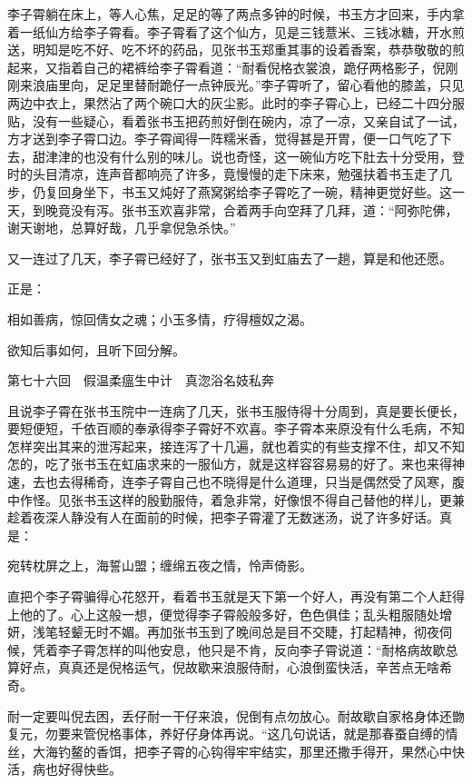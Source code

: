 \documentclass[12pt,UTF8]{ctexbook}
\begin{document}
{{{李子霄躺在床上，等人心焦，足足的等了两点多钟的时候，书玉方才回来，手内拿着一纸仙方给李子霄看。李子霄看了这个仙方，见是三钱薏米、三钱冰糖，开水煎送，明知是吃不好、吃不坏的药品，见张书玉郑重其事的设着香案，恭恭敬敬的煎起来，又指着自己的裙裤给李子霄看道：“耐看倪格衣裳浪，跪仔两格影子，倪刚刚来浪庙里向，足足里替耐跪仔一点钟辰光。”李子霄听了，留心看他的膝盖，只见两边中衣上，果然沾了两个碗口大的灰尘影。此时的李子霄心上，已经二十四分服贴，没有一些疑心，看着张书玉把药煎好倒在碗内，凉了一凉，又亲自试了一试，方才送到李子霄口边。李子霄闻得一阵糯米香，觉得甚是开胃，便一口气吃了下去，甜津津的也没有什么别的味儿。说也奇怪，这一碗仙方吃下肚去十分受用，登时的头目清凉，连声音都响亮了许多，竟慢慢的走下床来，勉强扶着书玉走了几步，仍复回身坐下，书玉又炖好了燕窝粥给李子霄吃了一碗，精神更觉好些。这一天，到晚竟没有泻。张书玉欢喜非常，合着两手向空拜了几拜，道：“阿弥陀佛，谢天谢地，总算好哉，几乎拿倪急杀快。”

又一连过了几天，李子霄已经好了，张书玉又到虹庙去了一趟，算是和他还愿。

正是：

相如善病，惊回倩女之魂；小玉多情，疗得檀奴之渴。

欲知后事如何，且听下回分解。





第七十六回　假温柔瘟生中计　真淴浴名妓私奔





且说李子霄在张书玉院中一连病了几天，张书玉服侍得十分周到，真是要长便长，要短便短，千依百顺的奉承得李子霄好不欢喜。李子霄本来原没有什么毛病，不知怎样突出其来的泄泻起来，接连泻了十几遍，就也着实的有些支撑不住，却又不知怎的，吃了张书玉在虹庙求来的一服仙方，就是这样容容易易的好了。来也来得神速，去也去得稀奇，连李子霄自己也不晓得是什么道理，只当是偶然受了风寒，腹中作怪。见张书玉这样的殷勤服侍，着急非常，好像恨不得自己替他的样儿，更兼趁着夜深人静没有人在面前的时候，把李子霄灌了无数迷汤，说了许多好话。真是：

宛转枕屏之上，海誓山盟；缠绵五夜之情，怜声倚影。

直把个李子霄骗得心花怒开，看着书玉就是天下第一个好人，再没有第二个人赶得上他的了。心上这般一想，便觉得李子霄般般多好，色色俱佳；乱头粗服随处增妍，浅笔轻颦无时不媚。再加张书玉到了晚间总是目不交睫，打起精神，彻夜伺候，凭着李子霄怎样的叫他安息，他只是不肯，反向李子霄说道：“耐格病故歇总算好点，真真还是倪格运气，倪故歇来浪服侍耐，心浪倒蛮快活，辛苦点无啥希奇。

耐一定要叫倪去困，丢仔耐一干仔来浪，倪倒有点勿放心。耐故歇自家格身体还朆复元，勿要来管倪格事体，养好仔身体再说。“这几句说话，就是那春蚕自缚的情丝，大海钓鳌的香饵，把李子霄的心钩得牢牢结实，那里还撒手得开，果然心中快活，病也好得快些。

}}}
\end{document}
